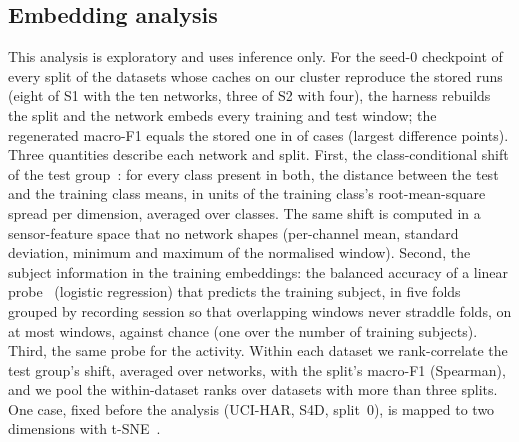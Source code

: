 \documentclass{IEEE_lsens}
\begin{document}
\subsection{Embedding analysis}\label{sec:emb}
This analysis is exploratory and uses inference only. For the seed-0 checkpoint of every split of the
 datasets whose caches on our cluster reproduce the stored runs (eight of S1 with the ten networks,
three of S2 with four), the harness rebuilds the split and the network embeds every training and test window; the
regenerated macro-F1 equals the stored one in  of  cases (largest
difference  points). Three quantities describe each network and
split. First, the class-conditional shift of the test group~\cite{zhang2013domain}: for every class present in both,
the distance between the test and the training class means, in units of the training class's root-mean-square spread
per dimension, averaged over classes. The same shift is computed in a sensor-feature space that no network shapes
(per-channel mean, standard deviation, minimum and maximum of the normalised window). Second, the subject information
in the training embeddings: the balanced accuracy of a linear probe~\cite{alain2016understanding} (logistic
regression) that predicts the training subject, in five folds grouped by recording session so that overlapping
windows never straddle folds, on at most  windows, against chance (one over the number of
training subjects). Third, the same probe for the activity. Within each dataset we rank-correlate the test group's
shift, averaged over networks, with the split's macro-F1 (Spearman), and we pool the within-dataset ranks over
datasets with more than three splits. One case, fixed before the analysis (UCI-HAR, S4D, split~0), is mapped to two
dimensions with t-SNE~\cite{vandermaaten2008visualizing}.
\end{document}
